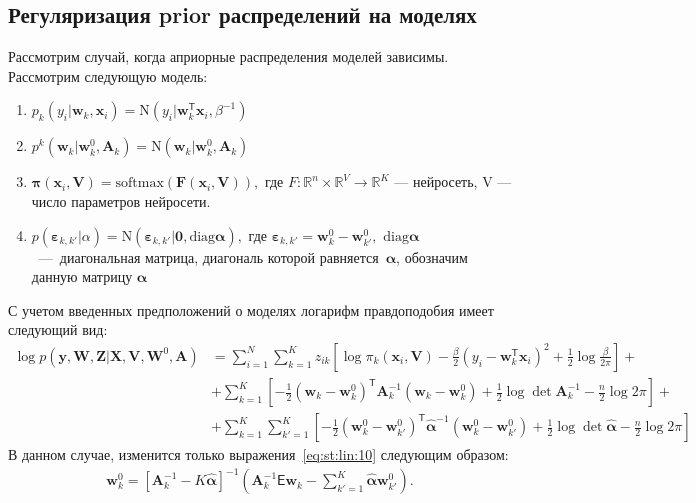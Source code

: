 \documentclass[12pt, twoside]{article}
\numberwithin{equation}{section}
\begin{document}
\subsection{Регуляризация prior распределений на моделях}
Рассмотрим случай, когда априорные распределения моделей зависимы. Рассмотрим следующую модель:
\begin{enumerate}
	\item $p_{k}\left(y_{i}|\textbf{w}_{k}, \textbf{x}_{i}\right) = \text{N}\left(y_{i}|\textbf{w}_{k}^{\mathsf{T}}\textbf{x}_{i}, \beta^{-1}\right)$
	\item $p^{k}\left(\textbf{w}_{k}|\textbf{w}^{0}_{k}, \textbf{A}_{k}\right) = \text{N}\left(\textbf{w}_{k}|\textbf{w}^{0}_{k}, \textbf{A}_{k}\right)$
	\item $\bm{\pi}\left(\textbf{x}_{i}, \textbf{V}\right) = \text{softmax}\left(\textbf{F}\left(\textbf{x}_{i}, \textbf{V}\right)\right),$ где $F : \mathbb{R}^{n}\times\mathbb{R}^{V}\to \mathbb{R}^{K}$ --- нейросеть, V --- число параметров нейросети.
	\item $p\left(\bm{\varepsilon}_{k,k'}|\alpha\right) = \text{N}\left(\bm{\varepsilon}_{k,k'}|\textbf{0}, \text{diag}\bm{\alpha}\right),$ где $\bm{\varepsilon}_{k,k'} = \textbf{w}_{k}^{0}-\textbf{w}_{k'}^{0},$ $\text{diag}\bm{\alpha}$~---~диагональная матрица, диагональ которой равняется~$\bm{\alpha}$, обозначим данную матрицу $\hat{\bm{\alpha}}$
\end{enumerate}
С учетом введенных предположений о моделях логарифм правдоподобия имеет следующий вид:
\begin{equation}
\label{eq:st:lin:1}
\begin{aligned}
\log p\left(\textbf{y}, \textbf{W}, \textbf{Z}|\textbf{X}, \textbf{V}, \textbf{W}^{0}, \textbf{A}\right) &= \sum_{i=1}^{N}\sum_{k=1}^{K}z_{ik}\left[\log\pi_k\left(\textbf{x}_i, \textbf{V}\right) - \frac{\beta}{2}\left(y_{i} - \textbf{w}_{k}^{\mathsf{T}}\textbf{x}_{i}\right)^{2} + \frac{1}{2}\log\frac{\beta}{2\pi}\right] +\\
&+ \sum_{k=1}^{K}\left[-\frac{1}{2}\left(\textbf{w}_{k} - \textbf{w}_{k}^{0}\right)^{\mathsf{T}}\textbf{A}_{k}^{-1}\left(\textbf{w}_{k} - \textbf{w}_{k}^{0}\right) + \frac{1}{2}\log\det\textbf{A}^{-1}_{k} - \frac{n}{2}\log2\pi\right]+\\
&+ \sum_{k=1}^{K}\sum_{k'=1}^{K}\left[-\frac{1}{2}\left(\textbf{w}_{k}^{0}-\textbf{w}_{k'}^{0}\right)^{\mathsf{T}}\hat{\bm{\alpha}}^{-1}\left(\textbf{w}_{k}^{0}-\textbf{w}_{k'}^{0}\right) +\frac{1}{2}\log\det\hat{\bm{\alpha}} -\frac{n}{2}\log{2\pi}\right]
\end{aligned}
\end{equation}
В данном случае, изменится только выражения~\eqref{eq:st:lin:10} следующим образом:
\begin{equation}
\label{eq:st:lin:reg:2}
\begin{aligned}
\textbf{w}_{k}^{0} =\left[\textbf{A}_{k}^{-1}-K\hat{\bm{\alpha}}\right]^{-1}\left(\textbf{A}^{-1}_{k}\mathsf{E}\textbf{w}_{k}-\sum_{k'=1}^{K}\hat{\bm{\alpha}}\textbf{w}_{k'}^{0}\right).
\end{aligned}
\end{equation}
\end{document}

